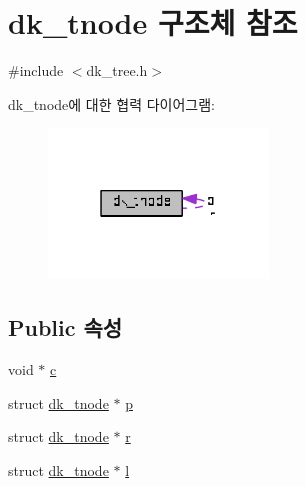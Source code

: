 \hypertarget{structdk__tnode}{\section{dk\+\_\+tnode 구조체 참조}
\label{structdk__tnode}
}


{\ttfamily \#include $<$dk\+\_\+tree.\+h$>$}



dk\+\_\+tnode에 대한 협력 다이어그램\+:
\nopagebreak
\begin{figure}[H]
\begin{center}
\leavevmode
\includegraphics[width=166pt]{structdk__tnode__coll__graph}
\end{center}
\end{figure}
\subsection*{Public 속성}
\begin{DoxyCompactItemize}
\item 
void $\ast$ \hyperlink{structdk__tnode_a4d8427a1419ca15308105dae0621c2bf}{c}
\item 
struct \hyperlink{structdk__tnode}{dk\+\_\+tnode} $\ast$ \hyperlink{structdk__tnode_a3a3fdb7d00634c393fad557eb15f0166}{p}
\item 
struct \hyperlink{structdk__tnode}{dk\+\_\+tnode} $\ast$ \hyperlink{structdk__tnode_a13392f297542ba6ec06da4e389ef3d7f}{r}
\item 
struct \hyperlink{structdk__tnode}{dk\+\_\+tnode} $\ast$ \hyperlink{structdk__tnode_acf718a20eaecd8c363ef2f70742013a5}{l}
\end{DoxyCompactItemize}


